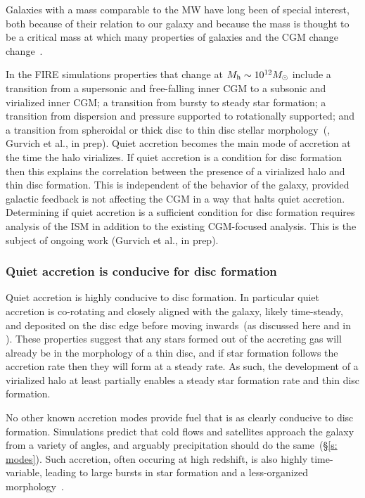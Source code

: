\documentclass[fleqn,usenatbib]{mnras}
\begin{document}
Galaxies with a mass comparable to the MW have long been of special interest, both because of their relation to our galaxy and because the mass is thought to be a critical mass at which many properties of galaxies and the CGM change change~\citep[e.g.][]{Fielding2017, Correa2017, Dekel2019a}.

In the FIRE simulations properties that change at $M_{\rm h}\sim10^{12} M_\odot$ include a transition from a supersonic and free-falling inner CGM to a subsonic and virialized inner CGM;
a transition from bursty to steady star formation;
a transition from dispersion and pressure supported to rotationally supported;
and a transition from spheroidal or thick disc to thin disc stellar morphology~(\citealt{El-Badry2018a, Stern2020, Yu2021}, Gurvich et al., in prep).
Quiet accretion becomes the main mode of accretion at the time the halo virializes.
If quiet accretion is a condition for disc formation then this explains the correlation between the presence of a virialized halo and thin disc formation.
This is independent of the behavior of the galaxy, provided galactic feedback is not affecting the CGM in a way that halts quiet accretion.
Determining if quiet accretion is a sufficient condition for disc formation requires analysis of the ISM in addition to the existing CGM-focused analysis.
This is the subject of ongoing work (Gurvich et al., in prep).

\subsubsection{Quiet accretion is conducive for disc formation}
\label{s: disc formation -- conducive}

Quiet accretion is highly conducive to disc formation.
In particular quiet accretion is co-rotating and closely aligned with the galaxy, likely time-steady, and deposited on the disc edge before moving inwards~(as discussed here and in \citealt{Trapp2021}).
These properties suggest that any stars formed out of the accreting gas will already be in the morphology of a thin disc, and if star formation follows the accretion rate then they will form at a steady rate.
As such, the development of a virialized halo at least partially enables a steady star formation rate and thin disc formation.

No other known accretion modes provide fuel that is as clearly conducive to disc formation.
Simulations predict that cold flows and satellites approach the galaxy from a variety of angles, and arguably precipitation should do the same~(\S\ref{s: modes}).
Such accretion, often occuring at high redshift, is also highly time-variable, leading to large bursts in star formation and a less-organized morphology~\citep{Muratov2015, Muratov2017}.
\end{document}
